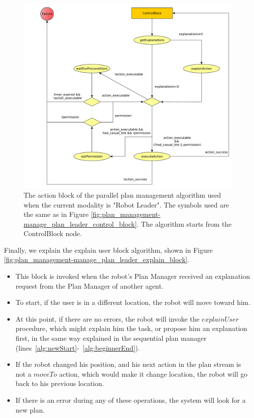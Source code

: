 \begin{figure}[ht!]
 \centering
 \includegraphics[scale=0.45]{img/plan_management/manage_plan_leader_action_block.pdf}
 \caption{The action block of the parallel plan management algorithm used when the current modality is "Robot Leader". The symbols used are the same as in Figure \ref{fig:plan_management-manage_plan_leader_control_block}. The algorithm starts from the ControlBlock node.}
 \label{fig:plan_management-manage_plan_leader_action_block}
 \end{figure}


Finally, we explain the explain user block algorithm, shown in Figure \ref{fig:plan_management-manage_plan_leader_explain_block}.
\begin{itemize}
\item This block is invoked when the robot's Plan Manager received an explanation request from the Plan Manager of another agent.
\item To start, if the user is in a different location, the robot will move toward him.
\item At this point, if there are no errors, the robot will invoke the $explainUser$ procedure, which might explain him the task, or propose him an explanation first, in the same way explained in the sequential plan manager (lines~\ref{alg:newStart}-~\ref{alg:beginnerEnd}). 
\item If the robot changed his position, and his next action in the plan stream is not a $moveTo$ action, which would make it change location, the robot will go back to his previous location.
\item If there is an error during any of these operations, the system will look for a new plan.
\end{itemize}


